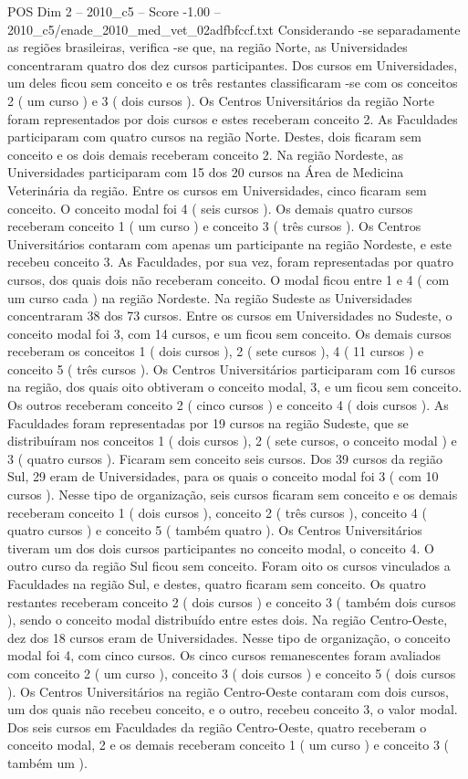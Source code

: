 \begin{textsample}{POS Dim 2 – 2010\_c5 – Score -1.00 – 2010\_c5/enade\_2010\_med\_vet\_02adfbfccf.txt}
Considerando -se separadamente as regiões brasileiras, verifica -se que, na região Norte, as Universidades concentraram quatro dos dez cursos participantes.
Dos cursos em Universidades, um deles ficou sem conceito e os três restantes classificaram -se com os conceitos 2 ( um curso ) e 3 ( dois cursos ).
Os Centros Universitários da região Norte foram representados por dois cursos e estes receberam conceito 2.
As Faculdades participaram com quatro cursos na região Norte.
Destes, dois ficaram sem conceito e os dois demais receberam conceito 2.
Na região Nordeste, as Universidades participaram com 15 dos 20 cursos na Área de Medicina Veterinária da região.
Entre os cursos em Universidades, cinco ficaram sem conceito.
O conceito modal foi 4 ( seis cursos ).
Os demais quatro cursos receberam conceito 1 ( um curso ) e conceito 3 ( três cursos ).
Os Centros Universitários contaram com apenas um participante na região Nordeste, e este recebeu conceito 3.
As Faculdades, por sua vez, foram representadas por quatro cursos, dos quais dois não receberam conceito.
O modal ficou entre 1 e 4 ( com um curso cada ) na região Nordeste.
Na região Sudeste as Universidades concentraram 38 dos 73 cursos.
Entre os cursos em Universidades no Sudeste, o conceito modal foi 3, com 14 cursos, e um ficou sem conceito.
Os demais cursos receberam os conceitos 1 ( dois cursos ), 2 ( sete cursos ), 4 ( 11 cursos ) e conceito 5 ( três cursos ).
Os Centros Universitários participaram com 16 cursos na região, dos quais oito obtiveram o conceito modal, 3, e um ficou sem conceito.
Os outros receberam conceito 2 ( cinco cursos ) e conceito 4 ( dois cursos ).
As Faculdades foram representadas por 19 cursos na região Sudeste, que se distribuíram nos conceitos 1 ( dois cursos ), 2 ( sete cursos, o conceito modal ) e 3 ( quatro cursos ).
Ficaram sem conceito seis cursos.
Dos 39 cursos da região Sul, 29 eram de Universidades, para os quais o conceito modal foi 3 ( com 10 cursos ).
Nesse tipo de organização, seis cursos ficaram sem conceito e os demais receberam conceito 1 ( dois cursos ), conceito 2 ( três cursos ), conceito 4 ( quatro cursos ) e conceito 5 ( também quatro ).
Os Centros Universitários tiveram um dos dois cursos participantes no conceito modal, o conceito 4.
O outro curso da região Sul ficou sem conceito.
Foram oito os cursos vinculados a Faculdades na região Sul, e destes, quatro ficaram sem conceito.
Os quatro restantes receberam conceito 2 ( dois cursos ) e conceito 3 ( também dois cursos ), sendo o conceito modal distribuído entre estes dois.
Na região Centro-Oeste, dez dos 18 cursos eram de Universidades.
Nesse tipo de organização, o conceito modal foi 4, com cinco cursos.
Os cinco cursos remanescentes foram avaliados com conceito 2 ( um curso ), conceito 3 ( dois cursos ) e conceito 5 ( dois cursos ).
Os Centros Universitários na região Centro-Oeste contaram com dois cursos, um dos quais não recebeu conceito, e o outro, recebeu conceito 3, o valor modal.
Dos seis cursos em Faculdades da região Centro-Oeste, quatro receberam o conceito modal, 2 e os demais receberam conceito 1 ( um curso ) e conceito 3 ( também um ).

\end{textsample}
